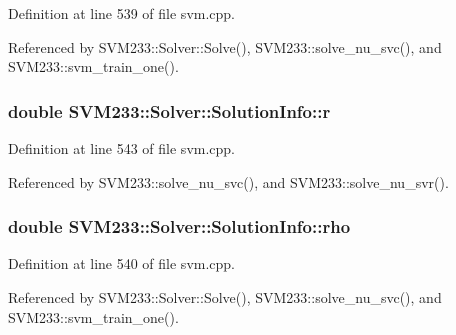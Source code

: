 Definition at line 539 of file svm.\+cpp.



Referenced by S\+V\+M233\+::\+Solver\+::\+Solve(), S\+V\+M233\+::solve\+\_\+nu\+\_\+svc(), and S\+V\+M233\+::svm\+\_\+train\+\_\+one().

\subsubsection[{\texorpdfstring{r}{r}}]{\setlength{\rightskip}{0pt plus 5cm}double S\+V\+M233\+::\+Solver\+::\+Solution\+Info\+::r}\hypertarget{struct_s_v_m233_1_1_solver_1_1_solution_info_a933250d505eef75a0173e33dbccb8f51}{}\label{struct_s_v_m233_1_1_solver_1_1_solution_info_a933250d505eef75a0173e33dbccb8f51}


Definition at line 543 of file svm.\+cpp.



Referenced by S\+V\+M233\+::solve\+\_\+nu\+\_\+svc(), and S\+V\+M233\+::solve\+\_\+nu\+\_\+svr().

\subsubsection[{\texorpdfstring{rho}{rho}}]{\setlength{\rightskip}{0pt plus 5cm}double S\+V\+M233\+::\+Solver\+::\+Solution\+Info\+::rho}\hypertarget{struct_s_v_m233_1_1_solver_1_1_solution_info_a86d34f2d8c16158bcddb3a4638a4cc2f}{}\label{struct_s_v_m233_1_1_solver_1_1_solution_info_a86d34f2d8c16158bcddb3a4638a4cc2f}


Definition at line 540 of file svm.\+cpp.



Referenced by S\+V\+M233\+::\+Solver\+::\+Solve(), S\+V\+M233\+::solve\+\_\+nu\+\_\+svc(), and S\+V\+M233\+::svm\+\_\+train\+\_\+one().

